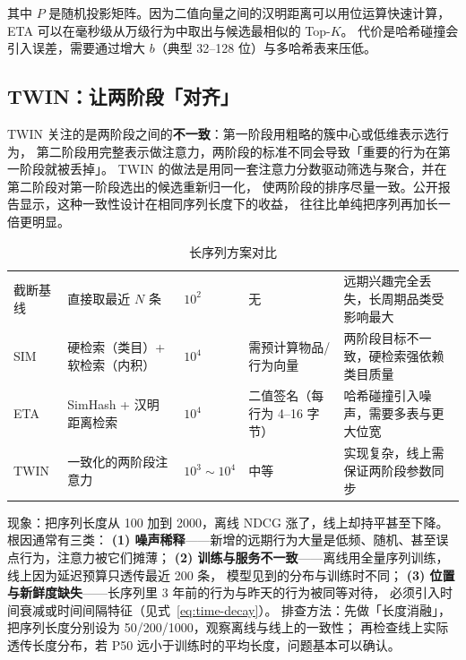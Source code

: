 其中 $P$ 是随机投影矩阵。因为二值向量之间的汉明距离可以用位运算快速计算，
ETA 可以在毫秒级从万级行为中取出与候选最相似的 Top-$K$。
代价是哈希碰撞会引入误差，需要通过增大 $b$（典型 32--128 位）与多哈希表来压低。

\subsection{TWIN：让两阶段「对齐」}

TWIN 关注的是两阶段之间的\textbf{不一致}：第一阶段用粗略的簇中心或低维表示选行为，
第二阶段用完整表示做注意力，两阶段的标准不同会导致「重要的行为在第一阶段就被丢掉」。
TWIN 的做法是用同一套注意力分数驱动筛选与聚合，并在第二阶段对第一阶段选出的候选重新归一化，
使两阶段的排序尽量一致。公开报告显示，这种一致性设计在相同序列长度下的收益，
往往比单纯把序列再加长一倍更明显。

\begin{table}[htbp]
\centering
\caption{长序列方案对比}
\label{tab:long-seq}
\small
\begin{tabularx}{\textwidth}{L{1.5cm} L{3.3cm} L{1.5cm} L{2.2cm} Y}
\toprule
{} &  &  &  &  \\
\midrule
截断基线 & 直接取最近 $N$ 条 & $10^2$ & 无 & 远期兴趣完全丢失，长周期品类受影响最大 \\
\addlinespace
SIM & 硬检索（类目）+ 软检索（内积） & $10^4$ & 需预计算物品/行为向量 & 两阶段目标不一致，硬检索强依赖类目质量 \\
\addlinespace
ETA & SimHash + 汉明距离检索 & $10^4$ & 二值签名（每行为 4--16 字节） & 哈希碰撞引入噪声，需要多表与更大位宽 \\
\addlinespace
TWIN & 一致化的两阶段注意力 & $10^3 \sim 10^4$ & 中等 & 实现复杂，线上需保证两阶段参数同步 \\
\bottomrule
\end{tabularx}
\end{table}

\begin{pitfall}
现象：把序列长度从 100 加到 2000，离线 NDCG 涨了，线上却持平甚至下降。
根因通常有三类：
\textbf{(1) 噪声稀释}——新增的远期行为大量是低频、随机、甚至误点行为，注意力被它们摊薄；
\textbf{(2) 训练与服务不一致}——离线用全量序列训练，线上因为延迟预算只透传最近 200 条，
模型见到的分布与训练时不同；
\textbf{(3) 位置与新鲜度缺失}——长序列里 3 年前的行为与昨天的行为被同等对待，
必须引入时间衰减或时间间隔特征（见式~\eqref{eq:time-decay}）。
排查方法：先做「长度消融」，把序列长度分别设为 50/200/1000，观察离线与线上的一致性；
再检查线上实际透传长度分布，若 P50 远小于训练时的平均长度，问题基本可以确认。
\end{pitfall}

